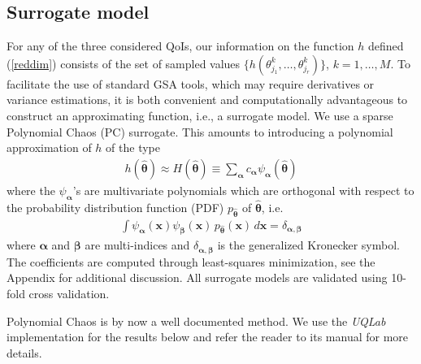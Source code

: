 \subsection{Surrogate model}
\label{sec:surrogate}
For any of the three considered QoIs, our information on the function $h$ defined (\ref{reddim}) consists of the set of sampled values $\{ h(\theta_{j_1}^k, \dots, \theta_{j_r}^k)\}$, $k=1, \dots, M$.  To facilitate the use of standard GSA tools, which may require derivatives or variance estimations, it is both convenient and computationally advantageous to construct an approximating function, i.e., a surrogate model. 
We use a sparse Polynomial Chaos (PC) surrogate. This amounts to introducing a polynomial approximation of $h$ of the type
\begin{eqnarray}
h(\hat{\boldsymbol{\theta}}) \approx H(\hat{\boldsymbol{\theta}}) \equiv \sum_{\boldsymbol{\alpha}} c_{\boldsymbol{\alpha}} \psi_{\boldsymbol{\alpha}}(\hat{\boldsymbol{\theta}}) \label{pce}
\end{eqnarray}
where the $\psi_{\boldsymbol{\alpha}}$'s are multivariate polynomials which are orthogonal with respect to the probability distribution function (PDF) $p_{\hat{\boldsymbol{\theta}}}$ of $\hat{\boldsymbol{\theta}}$, i.e.
\begin{eqnarray}
\int \psi_{\boldsymbol{\alpha}}(\mathbf x) \psi_{\boldsymbol{\beta}}(\mathbf x)\, p_{\hat{\boldsymbol{\theta}}}(\mathbf x) \, d\mathbf{x} = \delta _{\boldsymbol{\alpha},\boldsymbol{\beta}} \label{ortho}
\end{eqnarray}
where $\boldsymbol{\alpha}$ and $\boldsymbol{\beta}$ are multi-indices and $\delta _{\boldsymbol{\alpha},\boldsymbol{\beta}}$ is the generalized Kronecker symbol. The coefficients are computed through least-squares minimization, see the Appendix for additional discussion. All surrogate models are validated using 10-fold cross validation.

Polynomial Chaos is by now a well documented method. We use the \textit{UQLab} implementation for the results below and refer the reader to its manual \cite{uqlab} for more details.


